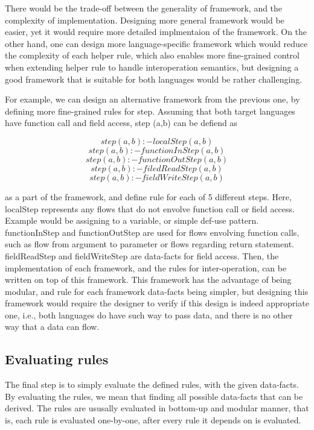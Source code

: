 There would be the trade-off between the generality of framework, and the
complexity of implementation. Designing more general framework would be easier,
yet it would require more detailed implmentaion of the framework. On the other
hand, one can design more language-specific framework which would reduce the
complexity of each helper rule, which also enables more fine-grained control
when extending helper rule to handle interoperation semantics, but designing a
good framework that is suitable for both languages would be rather challenging.

For example, we can design an alternative framework from the previous one, by
defining more fine-grained rules for step.  Assuming that both target languages
have function call and field access, step (a,b) can be defiend as

\[step(a,b) :- localStep(a, b)\]
\[step(a,b) :- functionInStep(a, b)\]
\[step(a,b) :- functionOutStep(a, b)\]
\[step(a,b) :- filedReadStep(a, b)\]
\[step(a,b) :- fieldWriteStep(a, b)\]

as a part of the framework, and define rule for each of 5 different steps.
Here, localStep represents any flows that do not envolve function call or field
access.  Example would be assigning to a variable, or simple def-use pattern.
functionInStep and functionOutStep are used for flows envolving function calls,
such as flow from argument to parameter or flows regarding return statement.
fieldReadStep and fieldWriteStep are data-facts for field access. Then, the
implementation of each framework, and the rules for inter-operation, can be
written on top of this framework. This framework has the advantage of being
modular, and rule for each framework data-facts being simpler, but designing
this framework would require the designer to verify if this design is indeed
appropriate one, i.e., both languages do have such way to pass data, and there
is no other way that a data can flow.


\subsection{Evaluating rules}

The final step is to simply evaluate the defined rules, with the given data-facts.
By evaluating the rules, we mean that finding all possible data-facts that
can be derived. The rules are ususally evaluated in bottom-up and
modular manner, that is, each rule is evaluated one-by-one, after every rule
it depends on is evaluated.



